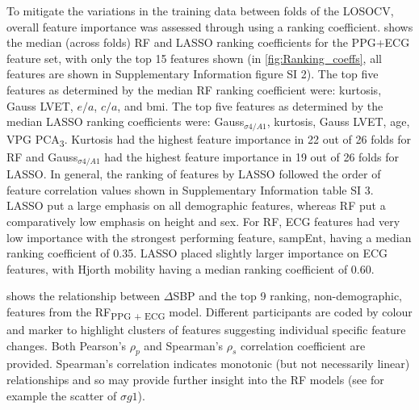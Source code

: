\documentclass[fleqn,10pt]{wlscirep}
\begin{document}
To mitigate the variations in the training data between folds of the LOSOCV, overall feature importance was assessed through using a ranking coefficient.  shows the median (across folds) RF and LASSO ranking coefficients for the PPG+ECG feature set, with only the top 15 features shown (in \cref{fig:Ranking_coeffs}, all features are shown in Supplementary Information figure SI 2). The top five features as determined by the median RF ranking coefficient were: kurtosis, Gauss LVET, $e/a$, $c/a$, and \ac{bmi}. The top five features as determined by the median LASSO ranking coefficients were: Gauss$_{\sigma4/A1}$, kurtosis, Gauss LVET, age, VPG PCA\textsubscript{3}. Kurtosis had the highest feature importance in 22 out of 26 folds for RF and Gauss$_{\sigma4/A1}$ had the highest feature importance in 19 out of 26 folds for LASSO. In general, the ranking of features by LASSO followed the order of feature correlation values shown in Supplementary Information table SI 3. LASSO put a large emphasis on all demographic features, whereas RF put a comparatively low emphasis on height and sex. For RF, ECG features had very low importance with the strongest performing feature, sampEnt, having a median ranking coefficient of 0.35. LASSO placed slightly larger importance on ECG features, with Hjorth mobility having a median ranking coefficient of 0.60.

 shows the relationship between $\Delta$SBP and the top 9 ranking, non-demographic, features from the RF\textsubscript{PPG + ECG} model. Different participants are coded by colour and marker to highlight clusters of features suggesting individual specific feature changes. Both Pearson's $\rho_p$ and Spearman's $\rho_s$ correlation coefficient are provided. Spearman's correlation indicates monotonic (but not necessarily linear) relationships and so may provide further insight into the RF models (see for example the scatter of $\sigma{g1}$).
\end{document}
